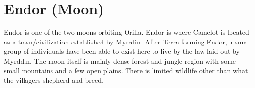 \section{Endor (Moon)}

Endor is one of the two moons orbiting Orilla. Endor is where Camelot is located as a town/civilization established by Myrrdin. After Terra-forming Endor, a small group of individuals have been able to exist here to live by the law laid out by Myrddin. The moon itself is mainly dense forest and jungle region with some small mountains and a few open plains. There is limited wildlife other than what the villagers shepherd and breed.
